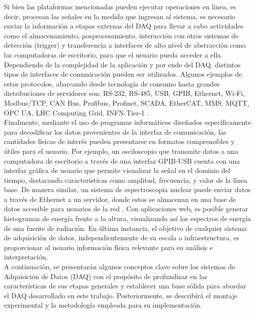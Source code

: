 \documentclass[]{book}
\begin{document}
\noindent Si bien las plataformas mencionadas pueden ejecutar operaciones en linea, es decir, procesan las señales en la medida que ingresan al sistema, es necesario enviar la información a etapas externas del DAQ para llevar a cabo actividades como el almacenamiento, posprocesamiento, interacción con otros sistemas de detección (trigger) y transferencia a interfaces de alto nivel de abstracción como las computadoras de escritorio, para que el usuario pueda acceder a ella. Dependiendo de la complejidad de la aplicación y por ende del DAQ, distintos tipos de interfaces de comunicación pueden ser utilizados. Algunos ejemplos de estos protocolos, abarcando desde tecnología de consumo hasta grandes distribuciones de servidores son: RS-232, RS-485, USB, GPIB, Ethernet, Wi-Fi, Modbus/TCP, CAN Bus, Profibus, Profinet, SCADA, EtherCAT, MMS, MQTT, OPC UA, LHC Computing Grid, INFN-Tier-1 \cite{zurawski2014industrial} \cite{bortolotti2012infn}.\\

\noindent Finalmente, mediante el uso de programas informáticos diseñados específicamente para decodificar los datos provenientes de la interfaz de comunicación, las cantidades físicas de interés pueden presentarse en formatos comprensibles y útiles para el usuario. Por ejemplo, un osciloscopio que transmite datos a una computadora de escritorio a través de una interfaz GPIB-USB cuenta con una interfaz gráfica de usuario que permite visualizar la señal en el dominio del tiempo, destacando características como amplitud, frecuencia, y valor de la línea base. De manera similar, un sistema de espectroscopía nuclear puede enviar datos a través de Ethernet a un servidor, donde estos se almacenan en una base de datos accesible para usuarios de la red \cite{crespo2021remote}. Con aplicaciones web, es posible generar histogramas de energía frente a la altura, visualizando así los espectros de energía de una fuente de radiación. En última instancia, el objetivo de cualquier sistema de adquisición de datos, independientemente de su escala o infraestructura, es proporcionar al usuario información física relevante para su análisis e interpretación.\\

\noindent A continuación, se presentarán algunos conceptos clave sobre los sistemas de Adquisición de Datos (DAQ) con el propósito de profundizar en las características de sus etapas generales y establecer una base sólida para abordar el DAQ desarrollado en este trabajo. Posteriormente, se describirá el montaje experimental y la metodología empleada para su implementación.\\
\end{document}
